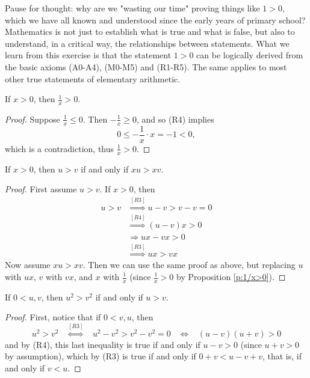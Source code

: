 \documentclass[11pt,dvipsnames]{book}
\numberwithin{equation}{section} %
\numberwithin{figure}{section} %
\numberwithin{table}{section} %
\begin{document}
Pause for thought: why are we "wasting our time" proving things like $1 > 0$, which we have all known and understood since the early years of primary school? 
Mathematics is not just to establish what is true and what is false, but also to understand, in a critical way, the relationships between statements.
What we learn from this exercise is that the statement $1 > 0$ can be logically derived from the basic axioms (A0-A4), (M0-M5) and (R1-R5).
The same applies to most other true statements of elementary arithmetic.

\begin{proposition}
\label{p:1/x>0}
If $x>0$, then $\frac{1}{x}>0$. 
\end{proposition}

\begin{proof}
Suppose $\frac{1}{x}\leq 0$. Then $-\frac{1}{x}\geq 0$, and so (R4) implies
\[
0\leq -\frac{1}{x}\cdot x = -1 < 0,\]
which is a contradiction, thus $\frac{1}{x}> 0$.
\end{proof}


\begin{proposition}
\label{p:xu>xv}
If $x>0$, then $u>v$ if and only if $xu>xv$. 
\end{proposition}

\begin{proof}
First assume $u>v$. If $x>0$, then 
\begin{align*}
u>v & \stackrel{[R3]}{\Longrightarrow} u-v>v-v=0\\
&  \stackrel{[R4]}{\Longrightarrow} (u-v)x>0\\
& \Longrightarrow ux-vx>0 \\
& \stackrel{[R3]}{\Longrightarrow} ux>vx 
\end{align*}
Now assume $xu>xv$. Then we can use the same proof as above, but replacing $u$ with $ux$, $v$ with $vx$, and $x$ with $\frac{1}{x}$ (since $\frac{1}{x}>0$ by Proposition \ref{p:1/x>0}).
\end{proof}


\begin{proposition}
\label{p:u^2>v^2}
If $0<u,v$, then $u^2>v^2$ if and only if $u>v$. 
\end{proposition}

\begin{proof}
First, notice that if $0<v,u$, then
\[
u^2>v^2 \;\;\;   \stackrel{[R3]}{ \Longleftrightarrow} \;\;\;  u^2-v^2>v^2-v^2=0 \;\;\;  \Longleftrightarrow \;\;\;  (u-v)(u+v)>0
\]
and by (R4), this last inequality is true if and only if $u-v>0$ (since $u+v>0$ by assumption), which by (R3) is true if and only if $0+v<u-v+v$, that is, if and only if $v<u$.
\end{proof}
\end{document}
